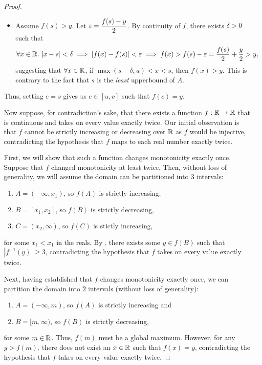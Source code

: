 \begin{problem}
\begin{proof}
\begin{subproof}
\begin{itemize}
        \item Assume $f(s) > y$. Let $\varepsilon = \dfrac{f(s) - y}{2}$. By continuity of $f$, there exists $\delta > 0$ 
          such that
          \[
            \forall x \in \mathbb{R}.\, \left\lvert x - s \right\rvert < \delta \implies \left\lvert f(x) - f(s) \right\rvert < \varepsilon \implies f(x) > f(s) - \varepsilon = \frac{f(s)}{2} + \frac{y}{2} > y,
          \]
          suggesting that $\forall x \in \mathbb{R}$, if $\max{(s - \delta, u)} < x < s$, then $f(x) > y$. This is contrary to the fact that
          $s$ is the \textit{least} upperbound of $A$.

      \end{itemize}

      Thus, setting $c = s$ gives us $c \in [u, v]$ such that $f(c) = y$.
    \end{subproof}

    Now suppose, for contradiction's sake, that there exists a function $f : \mathbb{R} \to \mathbb{R}$
    that is continuous and takes on every value exactly twice. Our initial
    observation is that $f$ cannot be strictly increasing or decreasing over 
    $\mathbb{R}$ as $f$ would be injective, contradicting the hypothesis that $f$ maps 
    to each real number exactly twice. 

    First, we will show that such a function changes monotonicity exactly once.
    Suppose that $f$ changed monotonicity at least twice. Then, without loss of generality, we will
    assume the domain can be partitioned into $3$ intervals:
    \begin{enumerate}[label=(\roman*)]
      \item $A = (-\infty, x_{1})$, so $f(A)$ is strictly increasing,
      \item $B = [x_{1}, x_{2}]$, so $f(B)$ is strictly decreasing,
      \item $C = (x_{2}, \infty)$, so $f(C)$ is stictly increasing,
    \end{enumerate}
    for some $x_{1} < x_{1}$ in the reals.
    By , there exists some $y \in f(B)$ 
    such that $|f^{-1}(y)| \geq 3$, contradicting the hypothesis that $f$ takes on every 
    value exactly twice.

    Next, having established that $f$ changes monotonicity exactly once,
    we can partition the domain into $2$ intervals (without loss of generality):
    \begin{enumerate}[label=(\roman*)]
      \item $A = (-\infty, m)$, so $f(A)$ is strictly increasing and
      \item $B = [m, \infty)$, so $f(B)$ is strictly decreasing,
    \end{enumerate}
    for some $m \in \mathbb{R}$.
    Thus, $f(m)$ must be a global maximum. However, for any $y > f(m)$, there
    does not exist an $x \in \mathbb{R}$ such that $f(x) = y$, contradicting the hypothesis that 
    $f$ takes on every value exactly twice.

  \end{proof}

\end{problem}


